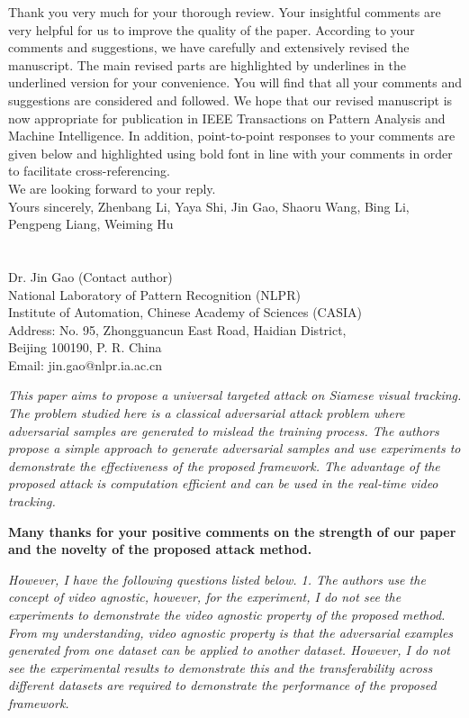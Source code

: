 \documentclass[12pt]{article}
\begin{document}
Thank you very much for your thorough review. Your insightful comments are very helpful for us to improve the quality of the paper. According to your comments and suggestions, we have carefully and extensively revised the manuscript. The main revised parts are highlighted by underlines in the underlined version for your convenience. You will find that all your comments and suggestions are considered and followed. We hope that our revised manuscript is now appropriate for publication in IEEE Transactions on Pattern Analysis and Machine Intelligence.
In addition, point-to-point responses to your comments are given below and highlighted using bold font in line with your comments in order to facilitate cross-referencing.\\[10pt]
\indent We are looking forward to your reply.\\[10pt]
\noindent Yours sincerely,
\noindent Zhenbang Li, Yaya Shi, Jin Gao, Shaoru Wang, Bing Li, Pengpeng Liang, Weiming Hu
\\
\\
\\
\noindent Dr. Jin Gao (Contact author)\\
\noindent National Laboratory of Pattern Recognition (NLPR)\\
\noindent Institute of Automation, Chinese Academy of Sciences (CASIA)\\
\noindent Address: No. 95, Zhongguancun East Road, Haidian District,\\
\noindent Beijing 100190, P. R. China\\
\noindent Email: jin.gao@nlpr.ia.ac.cn

\newpage
\textit{This paper aims to propose a universal targeted attack on Siamese visual tracking. The problem studied here is a classical adversarial attack problem where adversarial samples are generated to mislead the training process. The authors propose a simple approach to generate adversarial samples and use experiments to demonstrate the effectiveness of the proposed framework. The advantage of the proposed attack is computation efficient and can be used in the real-time video tracking.}

\textbf{Many thanks for your positive comments on the strength of our paper and the novelty of the proposed attack method.}

\textit{However, I have the following questions listed below. 1. The authors use the concept of video agnostic, however, for the experiment, I do not see the experiments to demonstrate the video agnostic property of the proposed method. From my understanding, video agnostic property is that the adversarial examples generated from one dataset can be applied to another dataset. However, I do not see the experimental results to demonstrate this and the transferability across different datasets are required to demonstrate the performance of the proposed framework.}
\end{document}
